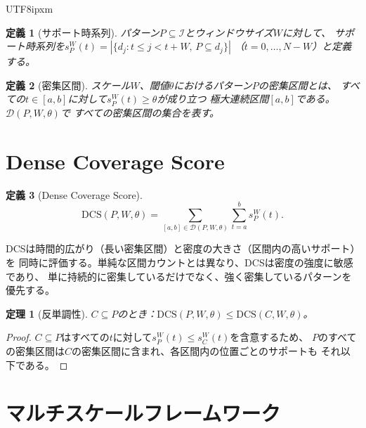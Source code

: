 \documentclass[conference]{IEEEtran}
\newtheorem{theorem}{定理}
\newtheorem{definition}{定義}
\begin{document}
\begin{CJK}{UTF8}{ipxm}
\begin{definition}[サポート時系列]
パターン$P \subseteq \mathcal{I}$とウィンドウサイズ$W$に対して、
サポート時系列を$s_P^W(t) = |\{d_j : t \leq j < t+W,\, P \subseteq d_j\}|$
（$t = 0, \ldots, N-W$）と定義する。
\end{definition}

\begin{definition}[密集区間]
スケール$W$、閾値$\theta$におけるパターン$P$の密集区間とは、
すべての$t \in [a,b]$に対して$s_P^W(t) \geq \theta$が成り立つ
極大連続区間$[a,b]$である。$\mathcal{D}(P, W, \theta)$で
すべての密集区間の集合を表す。
\end{definition}

\section{Dense Coverage Score}\label{sec:dcs}

\begin{definition}[Dense Coverage Score]
\begin{equation}
\mathrm{DCS}(P, W, \theta) = \sum_{[a,b] \in \mathcal{D}(P,W,\theta)}
  \sum_{t=a}^{b} s_P^W(t).
\end{equation}
\end{definition}

DCSは時間的広がり（長い密集区間）と密度の大きさ（区間内の高いサポート）を
同時に評価する。単純な区間カウントとは異なり、DCSは密度の強度に敏感であり、
単に持続的に密集しているだけでなく、強く密集しているパターンを優先する。

\begin{theorem}[反単調性]\label{thm:anti}
$C \subseteq P$のとき：$\mathrm{DCS}(P, W, \theta) \leq \mathrm{DCS}(C, W, \theta)$。
\end{theorem}

\begin{proof}
$C \subseteq P$はすべての$t$に対して$s_P^W(t) \leq s_C^W(t)$を含意するため、
$P$のすべての密集区間は$C$の密集区間に含まれ、各区間内の位置ごとのサポートも
それ以下である。
\end{proof}

\section{マルチスケールフレームワーク}\label{sec:multiscale}


\end{CJK}
\end{document}
